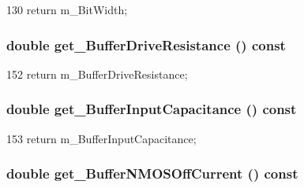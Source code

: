 \begin{DoxyCode}
130 { return m_BitWidth; }
\end{DoxyCode}
\hypertarget{classTechParameter_afbf3915cdc33b808b8ad9c5afb71516a}{
\subsubsection[{get\_\-BufferDriveResistance}]{\setlength{\rightskip}{0pt plus 5cm}double get\_\-BufferDriveResistance () const}}
\label{classTechParameter_afbf3915cdc33b808b8ad9c5afb71516a}



\begin{DoxyCode}
152 { return m_BufferDriveResistance; }
\end{DoxyCode}
\hypertarget{classTechParameter_ac94ae59a7943a65a6e9868383e6bea27}{
\subsubsection[{get\_\-BufferInputCapacitance}]{\setlength{\rightskip}{0pt plus 5cm}double get\_\-BufferInputCapacitance () const}}
\label{classTechParameter_ac94ae59a7943a65a6e9868383e6bea27}



\begin{DoxyCode}
153 { return m_BufferInputCapacitance; }
\end{DoxyCode}
\hypertarget{classTechParameter_aa1fbae5d74eb92a1a9c72a6fea9ca77f}{
\subsubsection[{get\_\-BufferNMOSOffCurrent}]{\setlength{\rightskip}{0pt plus 5cm}double get\_\-BufferNMOSOffCurrent () const}}
\label{classTechParameter_aa1fbae5d74eb92a1a9c72a6fea9ca77f}



